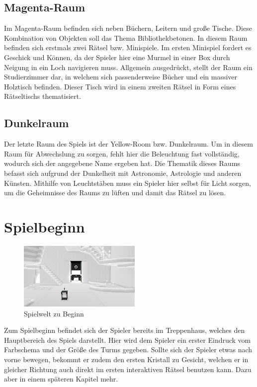 \subsection{Magenta-Raum}
Im Magenta-Raum befinden sich neben Büchern, Leitern und große Tische. Diese Kombination von Objekten soll das Thema \dq Bibliothek\dq betonen. In diesem Raum befinden sich erstmals zwei Rätsel bzw. Minispiele. Im ersten Minispiel fordert es Geschick und Können, da der Spieler hier eine Murmel in einer Box durch Neigung in ein Loch navigieren muss. Allgemein ausgedrückt, stellt der Raum ein Studierzimmer dar, in welchem sich passenderweise Bücher und ein massiver Holztisch befinden. Dieser Tisch wird in einem zweiten Rätsel in Form eines Rätseltischs thematisiert.
\subsection{Dunkelraum}
Der letzte Raum des Spiels ist der Yellow-Room bzw. Dunkelraum. Um in diesem Raum für Abwechslung zu sorgen, fehlt hier die Beleuchtung fast vollständig, wodurch sich der angegebene Name ergeben hat. Die Thematik dieses Raums befasst sich aufgrund der Dunkelheit mit Astronomie, Astrologie und anderen Künsten. Mithilfe von Leuchtstäben muss ein Spieler hier selbst für Licht sorgen, um die Geheimnisse des Raums zu lüften und damit das Rätsel zu lösen.

\newpage
\noindent
\section{Spielbeginn}
\begin{figure}
	\vspace*{-0.5cm}
	\includegraphics[width=5.9cm]{Pictures/Lobby_Start}
	\caption{Spielwelt zu Beginn}
	\vspace*{-0.5cm}
	\label{fig:spielwelt-beginn}
\end{figure}
Zum Spielbeginn befindet sich der Spieler bereits im Treppenhaus, welches den Hauptbereich des Spiels darstellt. Hier wird dem Spieler ein erster Eindruck vom Farbschema und der Größe des Turms gegeben. Sollte sich der Spieler etwas nach vorne bewegen, bekommt er zudem den ersten Kristall zu Gesicht, welchen er in gleicher Richtung auch direkt im ersten interaktiven Rätsel benutzen kann. Dazu aber in einem späteren Kapitel mehr.\\
